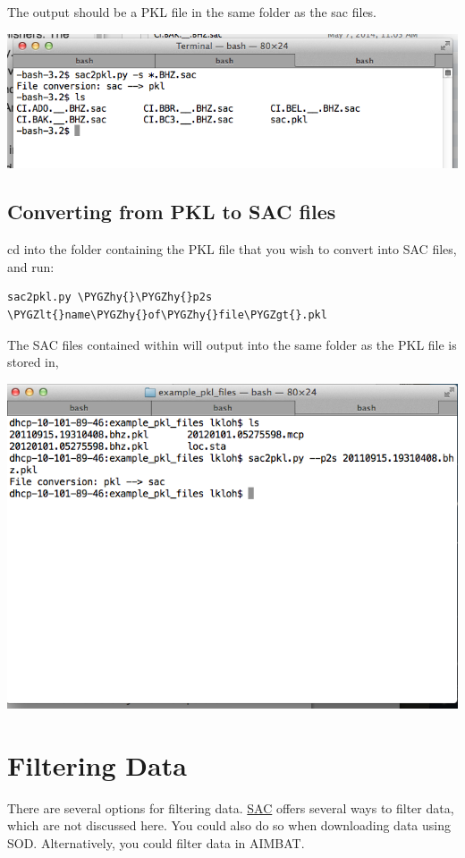 \documentclass[letterpaper,10pt,english]{sphinxmanual}
\def\PYGZlt{\char`\<}
\def\PYGZgt{\char`\>}
\def\PYGZhy{\char`\-}
\begin{document}
The output should be a PKL file in the same folder as the sac files.

\includegraphics{sac_to_pkl_conversion.png}


\section{Converting from PKL to SAC files}
\label{docfiles/sacioAIMBAT:converting-from-pkl-to-sac-files}
cd into the folder containing the PKL file that you wish to convert into SAC files, and run:

\begin{Verbatim}[commandchars=\\\{\}]
sac2pkl.py \PYGZhy{}\PYGZhy{}p2s \PYGZlt{}name\PYGZhy{}of\PYGZhy{}file\PYGZgt{}.pkl
\end{Verbatim}

The SAC files contained within will output into the same folder as the PKL file is stored in,

\includegraphics{pkl_to_sac_conversion.png}


\chapter{Filtering Data}
\label{docfiles/filteringData::doc}\label{docfiles/filteringData:filtering-data}
There are several options for filtering data. \href{http://www.iris.edu/files/sac-manual/}{SAC} offers several ways to filter data, which are not discussed here. You could also do so when downloading data using SOD. Alternatively, you could filter data in AIMBAT.
\end{document}

